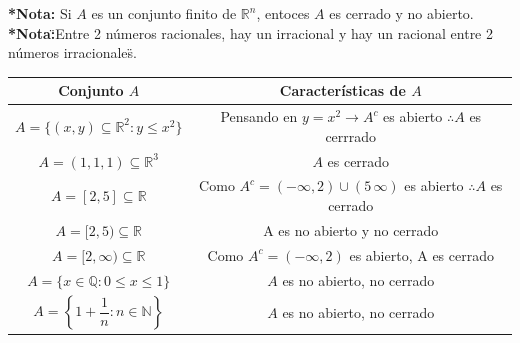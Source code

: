\documentclass[12pt]{article}
\begin{document}
\noindent\textbf{*Nota: }Si $A$ es un conjunto finito de $\mathbb{R}^n$, entoces $A$ es cerrado y no abierto.\newline
\noindent\textbf{*Nota:}\"{}Entre 2 números racionales, hay un irracional y hay un racional entre 2 números irracionales\"{}.\newline
\begin{center}
    \begin{tabular}{| c | c |}
    \hline
    Conjunto $A$ & Características de $A$ \\
    \hline
    $A=\{(x,y)\subseteq\mathbb{R}^2:y\leq x^2\}$ & Pensando en $y=x^2\rightarrow A^c$ es abierto $\therefore A$ es cerrrado  \\
    $A={(1,1,1)}\subseteq\mathbb{R}^3$ & $A$ es cerrado  \\
    $A=[2,5]\subseteq\mathbb{R}$ & Como $A^c=(-\infty,2)\cup(5\,\infty)$ es abierto $\therefore A$ es cerrado  \\
    $A=[2,5)\subseteq\mathbb{R}$ & A  es no abierto y no cerrado   \\
    $A=[2,\infty)\subseteq\mathbb{R}$ & Como $A^c=(-\infty,2)$ es abierto, A es cerrado  \\
    $A=\{x\in\mathbb{Q} : 0\leq x \leq 1\}$ & $A$ es no abierto, no cerrado\\
    $A=\left\{1+\dfrac{1}{n}:n\in\mathbb{N}\right\}$ & $A$ es no abierto, no cerrado \\
    \hline
    \end{tabular}
    \end{center}
\newpage
\end{document}
